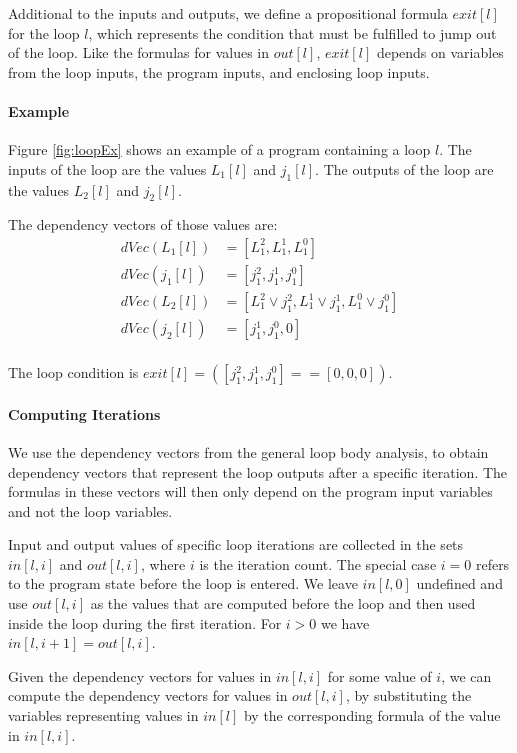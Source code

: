 Additional to the inputs and outputs, we define a propositional formula $exit[l]$ for the loop $l$, which represents the condition that must be fulfilled to jump out of the loop. Like the formulas for values in $out[l]$, $exit[l]$ depends on variables from the loop inputs, the program inputs, and enclosing loop inputs. 

\paragraph{Example}
Figure \ref{fig:loopEx} shows an example of a program containing a loop $l$. The inputs of the loop are the values $L_1[l]$ and $j_1[l]$. The outputs of the loop are the values $L_2[l]$ and $j_2[l]$.

The dependency vectors of those values are:
\begin{align*}
    dVec(L_1[l]) &= [L_1^2, L_1^1, L_1^0] \\
    dVec(j_1[l]) &= [j_1^2, j_1^1, j_1^0] \\
    dVec(L_2[l]) &= [L_1^2 \lor j_1^2, L_1^1 \lor j_1^1, L_1^0 \lor j_1^0] \\
    dVec(j_2[l]) &= [j_1^1, j_1^0, 0] \\
\end{align*}

The loop condition is $exit[l] = \left( [j_1^2, j_1^1, j_1^0] == [0, 0, 0] \right)$.

\paragraph{Computing Iterations}
We use the dependency vectors from the general loop body analysis, to obtain dependency vectors that represent the loop outputs after a specific iteration. The formulas in these vectors will then only depend on the program input variables and not the loop variables.

Input and output values of specific loop iterations are collected in the sets $in[l, i]$ and $out[l, i]$, where $i$ is the iteration count. The special case $i = 0$ refers to the program state before the loop is entered. We leave $in[l, 0]$ undefined and use $out[l, i]$ as the values that are computed before the loop and then used inside the loop during the first iteration. For $i > 0$ we have $in[l, i + 1] = out[l, i]$.

Given the dependency vectors for values in $in[l, i]$ for some value of $i$, we can compute the dependency vectors for values in $out[l, i]$, by substituting the variables representing values in $in[l]$ by the corresponding formula of the value in $in[l, i]$.

